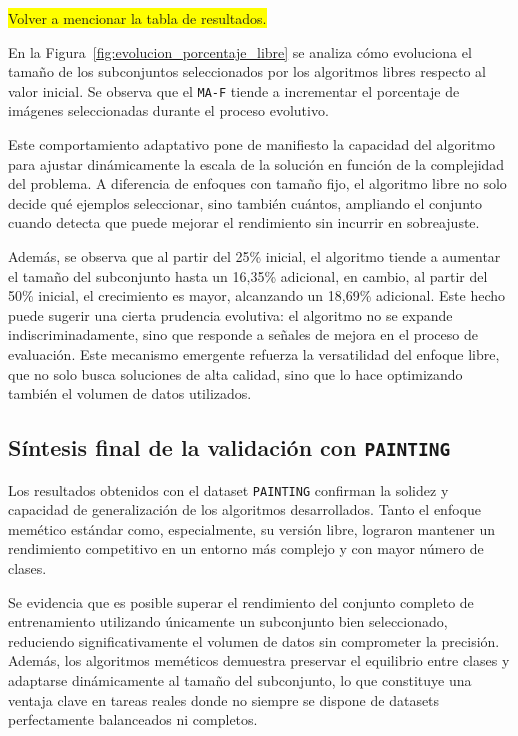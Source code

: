 \colorbox{yellow}{Volver a mencionar la tabla de resultados.}

En la Figura~\ref{fig:evolucion_porcentaje_libre} se analiza cómo evoluciona el tamaño de los subconjuntos seleccionados por los algoritmos libres respecto al valor inicial.
Se observa que el \texttt{MA-F} tiende a incrementar el porcentaje de imágenes seleccionadas durante el proceso evolutivo.

Este comportamiento adaptativo pone de manifiesto la capacidad del algoritmo para ajustar dinámicamente la escala de la solución en función de la complejidad del problema.
A diferencia de enfoques con tamaño fijo, el algoritmo libre no solo decide qué ejemplos seleccionar, sino también cuántos,
ampliando el conjunto cuando detecta que puede mejorar el rendimiento sin incurrir en sobreajuste.

Además, se observa que al partir del 25\% inicial, el algoritmo tiende a aumentar el tamaño del subconjunto hasta un 16,35\% adicional,
en cambio, al partir del 50\% inicial, el crecimiento es mayor, alcanzando un 18,69\% adicional.
Este hecho puede sugerir una cierta prudencia evolutiva: el algoritmo no se expande indiscriminadamente,
sino que responde a señales de mejora en el proceso de evaluación.
Este mecanismo emergente refuerza la versatilidad del enfoque libre, que no solo busca soluciones de alta calidad,
sino que lo hace optimizando también el volumen de datos utilizados.


\bigskip

\subsection*{Síntesis final de la validación con \texttt{PAINTING}}
Los resultados obtenidos con el dataset \texttt{PAINTING} confirman la solidez y capacidad de generalización de los algoritmos desarrollados.
Tanto el enfoque memético estándar como, especialmente, su versión libre, lograron mantener un rendimiento competitivo en un entorno más complejo y con mayor número de clases.

Se evidencia que es posible superar el rendimiento del conjunto completo de entrenamiento utilizando únicamente un subconjunto bien seleccionado,
reduciendo significativamente el volumen de datos sin comprometer la precisión.
Además, los algoritmos meméticos demuestra preservar el equilibrio entre clases y adaptarse dinámicamente al tamaño del subconjunto,
lo que constituye una ventaja clave en tareas reales donde no siempre se dispone de datasets perfectamente balanceados ni completos.

